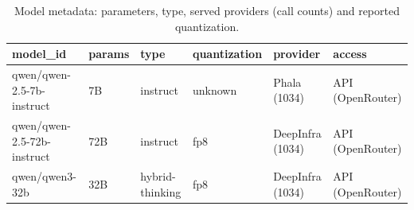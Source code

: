 \begin{table}[htbp]
\caption{Model metadata: parameters, type, served providers (call counts) and reported quantization.}
\label{tab:task1_metadata}
\begin{tabular}{llllll}
\toprule
model\_id & params & type & quantization & provider & access \\
\midrule
qwen/qwen-2.5-7b-instruct & 7B & instruct & unknown & Phala (1034) & API (OpenRouter) \\
qwen/qwen-2.5-72b-instruct & 72B & instruct & fp8 & DeepInfra (1034) & API (OpenRouter) \\
qwen/qwen3-32b & 32B & hybrid-thinking & fp8 & DeepInfra (1034) & API (OpenRouter) \\
\bottomrule
\end{tabular}
\end{table}
